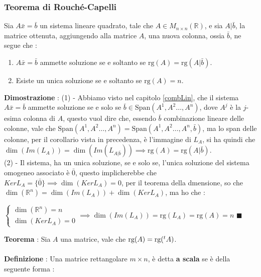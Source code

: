 \documentclass[12pt, letterpaper]{article}
\newcommand{\R}{{\mathbb R}}
\newcommand{\rg}{{\text{rg}}}
\newcommand{\acc}{\\\hphantom{}\\}
\newcommand{\Span}{{\text{Span}}}
\begin{document}
\subsubsection{Teorema di Rouché-Capelli}
Sia \(A\bar x=\bar b\) un sistema lineare quadrato, tale che \(A\in M_{n\times n}(\R)\), e sia \(A|\bar b\), la matrice 
ottenuta, aggiungendo alla matrice \(A\), una nuova colonna, ossia \(\bar b\), ne segue che :\begin{enumerate}
    \item \(A\bar x=\bar b\) ammette soluzione se e soltanto se \(\rg(A)=\rg(A|\bar b)\).
    \item Esiste un unica soluzione se e soltanto se \(\rg(A)=n\).
\end{enumerate}
\textbf{Dimostrazione} : (1) - Abbiamo visto nel capitolo \ref{combLin}, che il sistema \(A\bar x=\bar b\) ammette 
soluzione se e solo se \(\bar b \in \Span(A^1,A^2\dots, A^n)\), dove \(A^j\) è la \(j\)-esima colonna di \(A\), questo vuol dire 
che, essendo \(\bar b\) combinazione lineare delle colonne, vale che \(\Span(A^1,A^2\dots, A^n)=\Span(A^1,A^2\dots, A^n,\bar b)\), ma 
lo span delle colonne, per il corollario vista in precedenza, è l'immagine di \(L_A\), si ha quindi che 
\(\dim(Im(L_A))=\dim(Im(L_{A|\bar b}))\implies \rg(A)=\rg(A|\bar b)\).\\ 
(2) - Il sistema, ha un unica soluzione, se e solo se, l'unica soluzione del sistema omogeneo associato è \(\bar 0\), 
questo implicherebbe che \(KerL_A=\{\bar 0\}\implies \dim(KerL_A)=0\), per il teorema della dmensione, so che 
\(\dim(\R^n)=\dim(Im(L_A))+\dim(KerL_A)\), ma ho che :\begin{center}\(
    \begin{cases}
        \dim(\R^n)=n\\\dim(KerL_A)=0
    \end{cases}\implies \dim(Im(L_A))=\rg(L_A)=\rg(A)=n
\)\hphantom{text} \(\blacksquare\)\end{center} 
\textbf{Teorema }: Sia \(A\) una matrice, vale che \(\rg(A)=\rg(\text{\hphantom{}}^tA)\).\acc 
\textbf{Definizione }: Una matrice rettangolare \(m\times n\), è detta \textbf{a scala} se è della 
seguente forma :  \begin{figure}[h]
    \end{figure}\\
\end{document}
